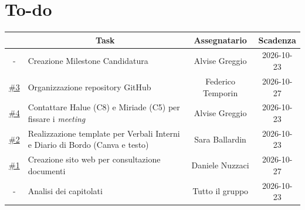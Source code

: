 \documentclass[11pt, a4paper]{article}
\begin{document}
\section{To-do}
\begin{center}
    \renewcommand{\arraystretch}{1.5}
    \begin{tabularx}{\textwidth}{|c|X|c|c|}
        \hline
        \rowcolor{gray!10} 
        \multicolumn{1}{|c|}{\textbf{ID issue}} & 
        \multicolumn{1}{c|}{\textbf{Task}} & 
        \multicolumn{1}{c|}{\textbf{Assegnatario}} & 
        \multicolumn{1}{c|}{\textbf{Scadenza}} \\
        \hline 
        - & Creazione Milestone Candidatura & Alvise Greggio & 2026-10-23 \\
        \hline
        \href{https://github.com/On-By-One-Team/On-By-One.github.io/issues/3}{\#3} & Organizzazione repository GitHub & Federico Temporin & 2026-10-27 \\
        \hline
        \href{https://github.com/On-By-One-Team/On-By-One.github.io/issues/4}{\#4} & Contattare Halue (C8) e Miriade (C5) per fissare i \textit{meeting} & Alvise Greggio & 2026-10-23 \\
        \hline
        \href{https://github.com/On-By-One-Team/On-By-One.github.io/issues/2}{\#2} & Realizzazione template per Verbali Interni e Diario di Bordo (Canva e testo) & Sara Ballardin & 2026-10-23 \\
        \hline
        \href{https://github.com/On-By-One-Team/On-By-One.github.io/issues/1}{\#1} & Creazione sito web per consultazione documenti & Daniele Nuzzaci & 2026-10-27 \\
        \hline
        - & Analisi dei capitolati & Tutto il gruppo & 2026-10-23 \\
        \hline
    \end{tabularx}
\end{center}
\end{document}

